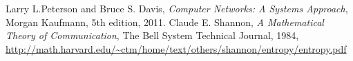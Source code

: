 \begin{thebibliography}{9}

  Larry L.Peterson and Bruce S. Davis,
  \emph{Computer Networks: A Systems Approach},
  Morgan Kaufmann,
  5th edition,
  2011.
	Claude E. Shannon,
	\emph{A Mathematical Theory of Communication},
	The Bell System Technical Journal,
	1984,
	\url{http://math.harvard.edu/~ctm/home/text/others/shannon/entropy/entropy.pdf}
\end{thebibliography}
